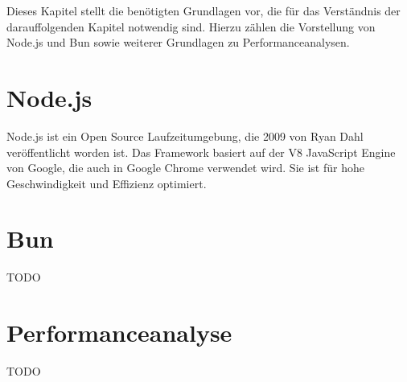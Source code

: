  \label{Grundlagen}
Dieses Kapitel stellt die benötigten Grundlagen vor, die für das Verständnis der darauffolgenden Kapitel notwendig sind. Hierzu zählen die Vorstellung von Node.js und Bun sowie weiterer Grundlagen zu Performanceanalysen.

\section{Node.js} \label{sec:Node.js}
Node.js ist ein Open Source Laufzeitumgebung, die 2009 von Ryan Dahl veröffentlicht worden ist. Das Framework basiert auf der V8 JavaScript Engine von Google, die auch in Google Chrome verwendet wird. Sie ist für hohe Geschwindigkeit und Effizienz optimiert. \\

\section{Bun} \label{sec:Node}
TODO\\

\section{Performanceanalyse} \label{sec:Performanceanalyse}
TODO\\
